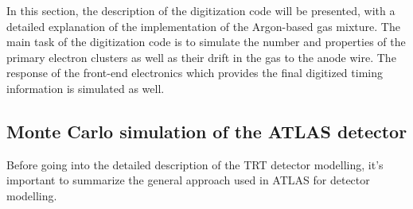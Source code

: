 In this section, the description of the digitization code will be presented, with a detailed explanation of the implementation of the Argon-based gas mixture.
The main task of the digitization code is to simulate the number and properties of the primary electron clusters as well as their drift in the gas to the anode wire. 
The response of the front-end electronics which provides the final digitized timing information is simulated as well. 

\subsection{Monte Carlo simulation of the ATLAS detector}

Before going into the detailed description of the TRT detector modelling, it's important to summarize the
general approach used in ATLAS for detector modelling.

